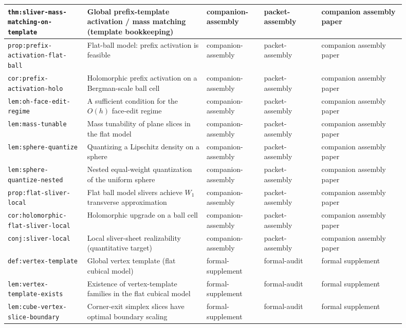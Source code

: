 \documentclass[11pt]{article}
\numberwithin{equation}{section}  %
\theoremstyle{plain}
\theoremstyle{definition}
\theoremstyle{remark}
\begin{document}
\begin{longtable}{|p{0.18\linewidth}|p{0.27\linewidth}|p{0.13\linewidth}|p{0.13\linewidth}|p{0.19\linewidth}|}
\texttt{thm:sliver-mass-matching-on-template} & Global prefix-template activation / mass matching (template bookkeeping) & companion-assembly & packet-assembly & companion assembly paper \\ \hline
\texttt{prop:prefix-activation-flat-ball} & Flat-ball model: prefix activation is feasible & companion-assembly & packet-assembly & companion assembly paper \\ \hline
\texttt{cor:prefix-activation-holo} & Holomorphic prefix activation on a Bergman-scale ball cell & companion-assembly & packet-assembly & companion assembly paper \\ \hline
\texttt{lem:oh-face-edit-regime} & A sufficient condition for the $O(h)$ face-edit regime & companion-assembly & packet-assembly & companion assembly paper \\ \hline
\texttt{lem:mass-tunable} & Mass tunability of plane slices in the flat model & companion-assembly & packet-assembly & companion assembly paper \\ \hline
\texttt{lem:sphere-quantize} & Quantizing a Lipschitz density on a sphere & companion-assembly & packet-assembly & companion assembly paper \\ \hline
\texttt{lem:sphere-quantize-nested} & Nested equal-weight quantization of the uniform sphere & companion-assembly & packet-assembly & companion assembly paper \\ \hline
\texttt{prop:flat-sliver-local} & Flat ball model slivers achieve $W_1$ transverse approximation & companion-assembly & packet-assembly & companion assembly paper \\ \hline
\texttt{cor:holomorphic-flat-sliver-local} & Holomorphic upgrade on a ball cell & companion-assembly & packet-assembly & companion assembly paper \\ \hline
\texttt{conj:sliver-local} & Local sliver-sheet realizability (quantitative target) & companion-assembly & packet-assembly & companion assembly paper \\ \hline
\texttt{def:vertex-template} & Global vertex template (flat cubical model) & formal-supplement & formal-audit & formal supplement \\ \hline
\texttt{lem:vertex-template-exists} & Existence of vertex-template families in the flat cubical model & formal-supplement & formal-audit & formal supplement \\ \hline
\texttt{lem:cube-vertex-slice-boundary} & Corner-exit simplex slices have optimal boundary scaling & formal-supplement & formal-audit & formal supplement \\ \hline

\end{longtable}
\end{document}
